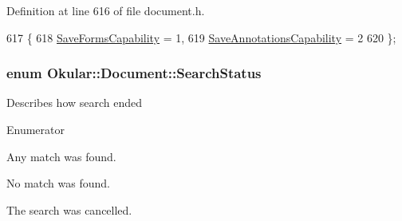 Definition at line 616 of file document.\+h.


\begin{DoxyCode}
617         \{
618             \hyperlink{classOkular_1_1Document_a7aa93fc147bd5aa966d65477b5c5eae9af3700f1553625c9cf992b4c5cc783ccd}{SaveFormsCapability} = 1,       
619             \hyperlink{classOkular_1_1Document_a7aa93fc147bd5aa966d65477b5c5eae9ab39f6065bb5cff48353657ac469f827b}{SaveAnnotationsCapability} = 2  
620         \};
\end{DoxyCode}
\hypertarget{classOkular_1_1Document_aa9c2934f6abce7b0440ec74bb56eefbb}{
\subsubsection[{Search\+Status}]{\setlength{\rightskip}{0pt plus 5cm}enum {\bf Okular\+::\+Document\+::\+Search\+Status}}}\label{classOkular_1_1Document_aa9c2934f6abce7b0440ec74bb56eefbb}
Describes how search ended \begin{Desc}
\item[Enumerator]\par
\begin{description}
\item[{\em 
\hypertarget{classOkular_1_1Document_aa9c2934f6abce7b0440ec74bb56eefbbaee768cc03e09b4188b091b652e1556ab}{Match\+Found}\label{classOkular_1_1Document_aa9c2934f6abce7b0440ec74bb56eefbbaee768cc03e09b4188b091b652e1556ab}
}]Any match was found. \item[{\em 
\hypertarget{classOkular_1_1Document_aa9c2934f6abce7b0440ec74bb56eefbba6f1e44c2a23dde543d40770f949a2882}{No\+Match\+Found}\label{classOkular_1_1Document_aa9c2934f6abce7b0440ec74bb56eefbba6f1e44c2a23dde543d40770f949a2882}
}]No match was found. \item[{\em 
\hypertarget{classOkular_1_1Document_aa9c2934f6abce7b0440ec74bb56eefbbacc76ba5b7c23f4d24515076e946373b4}{Search\+Cancelled}\label{classOkular_1_1Document_aa9c2934f6abce7b0440ec74bb56eefbbacc76ba5b7c23f4d24515076e946373b4}
}]The search was cancelled. \end{description}
\end{Desc}


